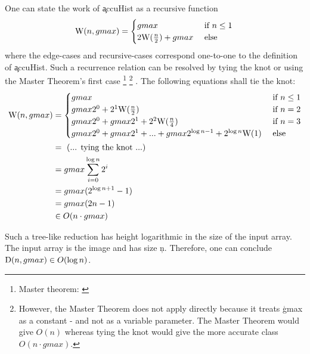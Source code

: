     One can state the work of \c{accuHist} as a recursive function
    \begin{equation*}
    \textrm{W}(n,gmax) = \begin{cases}
                 gmax & \text{ if } n \le 1 \\ 
                 2 \textrm{W}(\frac{n}{2}) + gmax & \text{ else }
                \end{cases} \\
    \end{equation*}
    where the edge-cases and recursive-cases correspond one-to-one
    to the definition of \c{accuHist}.
    Such a recurrence relation can be resolved by tying the knot
    or using the Master Theorem's first case
    \footnote{Master theorem: \cite{Cormen2001}}
    \footnote{However, the Master Theorem does not apply directly
    because it treats \c{gmax} as a constant -
    and not as a variable parameter.
    The Master Theorem would give $O(n)$ whereas tying the knot
    would give the more accurate class $O(n \cdot gmax)$.}
    .
    The following equations shall tie the knot:
    \begin{equation*}
    \begin{split}
    \textrm{W}(n,gmax)
      & = \begin{cases}
            gmax & \text{ if } n \le 1 \\ 
            gmax2^0 + 2^1\textrm{W}(\frac{n}{2}) & \text{ if } n = 2 \\
            gmax2^0 + gmax2^1 + 2^2\textrm{W}(\frac{n}{4}) & \text{ if } n = 3 \\
            gmax2^0 + gmax2^1 + ... + gmax 2^{\log n - 1} + 2^{\log n}\textrm{W}(1) & \text{ else }
          \end{cases} \\
      & = \textrm{ (... tying the knot ...) } \\
      & = gmax \sum_{i=0}^{\log n}{2^i} \\
      & = gmax (2^{\log n + 1} - 1) \\
      & = gmax (2n - 1) \\
      & \in O(n \cdot gmax) \\
    \end{split}
    \end{equation*}
    
    Such a tree-like reduction has height logarithmic
    in the size of the input array. The input array is the image and
    has size \c{n}. Therefore, one can conclude
    $\textrm{D}(n, gmax) \in O(\log n)$.
  
